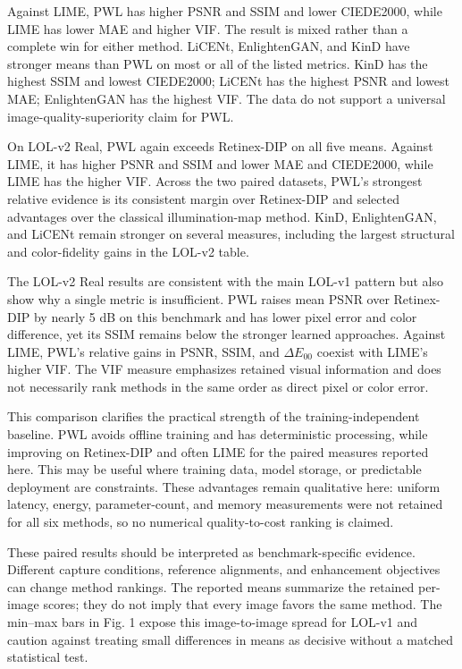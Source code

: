 \documentclass[conference]{IEEEtran}
\begin{document}
Against LIME, PWL has higher PSNR and SSIM and lower CIEDE2000, while LIME has lower MAE and higher VIF. The result is mixed rather than a complete win for either method. LiCENt, EnlightenGAN, and KinD have stronger means than PWL on most or all of the listed metrics. KinD has the highest SSIM and lowest CIEDE2000; LiCENt has the highest PSNR and lowest MAE; EnlightenGAN has the highest VIF. The data do not support a universal image-quality-superiority claim for PWL.

On LOL-v2 Real, PWL again exceeds Retinex-DIP on all five means. Against LIME, it has higher PSNR and SSIM and lower MAE and CIEDE2000, while LIME has the higher VIF. Across the two paired datasets, PWL's strongest relative evidence is its consistent margin over Retinex-DIP and selected advantages over the classical illumination-map method. KinD, EnlightenGAN, and LiCENt remain stronger on several measures, including the largest structural and color-fidelity gains in the LOL-v2 table.

The LOL-v2 Real results are consistent with the main LOL-v1 pattern but also show why a single metric is insufficient. PWL raises mean PSNR over Retinex-DIP by nearly 5 dB on this benchmark and has lower pixel error and color difference, yet its SSIM remains below the stronger learned approaches. Against LIME, PWL's relative gains in PSNR, SSIM, and $\Delta E_{00}$ coexist with LIME's higher VIF. The VIF measure emphasizes retained visual information and does not necessarily rank methods in the same order as direct pixel or color error.

This comparison clarifies the practical strength of the training-independent baseline. PWL avoids offline training and has deterministic processing, while improving on Retinex-DIP and often LIME for the paired measures reported here. This may be useful where training data, model storage, or predictable deployment are constraints. These advantages remain qualitative here: uniform latency, energy, parameter-count, and memory measurements were not retained for all six methods, so no numerical quality-to-cost ranking is claimed.

These paired results should be interpreted as benchmark-specific evidence. Different capture conditions, reference alignments, and enhancement objectives can change method rankings. The reported means summarize the retained per-image scores; they do not imply that every image favors the same method. The min--max bars in Fig. 1 expose this image-to-image spread for LOL-v1 and caution against treating small differences in means as decisive without a matched statistical test.
\end{document}

